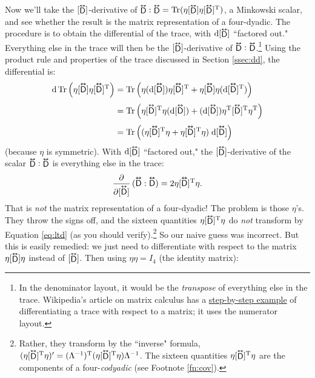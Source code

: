 \documentclass[12pt]{article}
\newcommand{\dd}[1]{\mathrm{d}#1}
\newcommand{\tightoverset}[2]{%
  \mathop{#2}\limits^{\vbox to -.5ex{\kern-0.75ex\hbox{$#1$}\vss}}}
\newcommand{\inlinedy}[1]{\tightoverset{\text{\tiny$\bm\leftrightarrow$}}{#1}}
\newcommand{\fnoverset}[2]{%
  \mathop{#2}\limits^{\vbox to -.5ex{\kern-0.85ex\hbox{$#1$}\vss}}}
\newcommand{\footnotedy}[1]{\fnoverset{\text{\tiny$\bm\leftrightarrow$}}{#1}}
\newcommand{\capdy}[1]{ \overset{ \text{\tiny$\bm\leftrightarrow$} }{\vphantom{\text{\small{A}}}\smash{#1}} }
\begin{document}
Now we'll take the $[\inlinedy{\mathsf{D}}]$-derivative of $\inlinedy{\mathsf{D}} : \inlinedy{\mathsf{D}} = \mathrm{Tr} (\eta [ \inlinedy{\mathsf{D}} ] \eta [ \inlinedy{\mathsf{D}} ] ^{\mathrm{T}} )$, a Minkowski scalar, and see whether the result is the matrix representation of a four-dyadic. The procedure is to obtain the differential of the trace, with $\dd [ \inlinedy{\mathsf{D}} ]$ ``factored out." Everything else in the trace will then be the $[\inlinedy{\mathsf{D}}]$-derivative of $\inlinedy{\mathsf{D}} : \inlinedy{\mathsf{D}}$.\footnote{In the denominator layout, it would be the \emph{transpose} of everything else in the trace. Wikipedia's article on matrix calculus has a \href{https://en.wikipedia.org/wiki/Matrix_calculus\#Scalar-by-matrix_identities}{step-by-step example} of differentiating a trace with respect to a matrix; it uses the numerator layout.} Using the product rule and properties of the trace discussed in Section \ref{ssec:dd}, the differential is:
\begin{equation*}
\begin{aligned}
\dd \, \mathrm{Tr} \left( \eta [\capdy{\mathsf{D}}] \eta [ \capdy{\mathsf{D}} ]^{\mathrm{T}} \right) &= \mathrm{Tr} \left( \eta (\dd [\capdy{\mathsf{D}}]) \eta [ \capdy{\mathsf{D}} ]^{\mathrm{T}} + \eta [\capdy{\mathsf{D}}] \eta (\dd [ \capdy{\mathsf{D}} ]^{\mathrm{T}}) \right) \\[3pt]
&= \mathrm{Tr} \left( \eta [ \capdy{\mathsf{D}} ]^{\mathrm{T}} \eta (\dd [\capdy{\mathsf{D}}]) + (\dd [\capdy{\mathsf{D}}]) \eta^\mathrm{T} [\capdy{\mathsf{D}}]^\mathrm{T} \eta^{\mathrm{T}} \right) \\[3pt]
&= \mathrm{Tr} \left( ( \eta [ \capdy{\mathsf{D}} ]^{\mathrm{T}} \eta + \eta [\capdy{\mathsf{D}}]^\mathrm{T} \eta ) \; \dd [\capdy{\mathsf{D}}] \right)
\end{aligned}
\end{equation*}
(because $\eta$ is symmetric). With $\dd [ \inlinedy{\mathsf{D}} ]$ ``factored out," the $[\inlinedy{\mathsf{D}}]$-derivative of the scalar $\inlinedy{\mathsf{D}} : \inlinedy{\mathsf{D}}$ is everything else in the trace:
\begin{equation*}
\dfrac{\partial}{\partial [ \capdy{\mathsf{D}} ]} \, ( \capdy{\mathsf{D}} : \capdy{\mathsf{D}} ) = 2 \eta [\capdy{\mathsf{D}}]^\mathrm{T} \eta .
\end{equation*}
That is \emph{not} the matrix representation of a four-dyadic! The problem is those $\eta$'s. They throw the signs off, and the sixteen quantities $\eta [\inlinedy{\mathsf{D}}]^\mathrm{T} \eta$ do \emph{not} transform by Equation \ref{eq:ltd} (as you should verify).\footnote{Rather, they transform by the ``inverse" formula, ${ ( \eta [\footnotedy{\mathsf{D}}]^\mathrm{T} \eta ) ^\prime = ( \Lambda ^{-1} ) ^\mathrm{T} ( \eta [\footnotedy{\mathsf{D}}]^\mathrm{T} \eta ) \Lambda ^{-1} }$. The sixteen quantities $\eta [\footnotedy{\mathsf{D}}]^\mathrm{T} \eta$ are the components of a four-\emph{codyadic} (see Footnote \ref{fn:cov}).} So our naive guess was incorrect. But this is easily remedied: we just need to differentiate with respect to the matrix $\eta [\inlinedy{\mathsf{D}}] \eta$ instead of $[\inlinedy{\mathsf{D}}]$. Then using $\eta \eta = I_4$ (the identity matrix):
\end{document}
